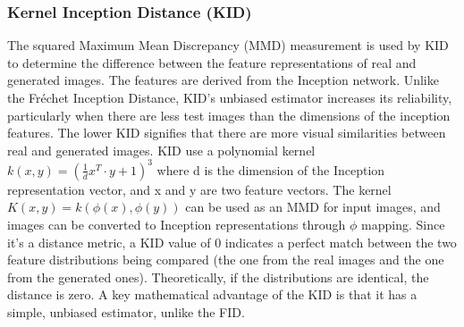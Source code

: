 \documentclass[journal]{IEEEtran}
\begin{document}
\subsubsection{Kernel Inception Distance (KID)}
The squared Maximum Mean Discrepancy (MMD) measurement is used by KID to determine the difference between the feature representations of real and generated images. The features are derived from the Inception network. Unlike the Fréchet Inception Distance\cite{heusel2017gans}, KID's unbiased estimator increases its reliability, particularly when there are less test images than the dimensions of the inception features. The lower KID signifies that there are more visual similarities between real and generated images\cite{kim2019ugatit}.
KID use a polynomial kernel $k(x,y)=(\frac{1}{d}x^T\cdot y+1)^3$ where d is the dimension of the Inception representation vector, and x and y are two feature vectors. The kernel $K(x,y)=k(\phi(x),\phi(y))$ can be used as an MMD for input images, and images can be converted to Inception representations through $\phi$ mapping\cite{binkowski2018demystifying}.
Since it's a distance metric, a KID value of 0 indicates a perfect match between the two feature distributions being compared (the one from the real images and the one from the generated ones). Theoretically, if the distributions are identical, the distance is zero. A key mathematical advantage of the KID is that it has a simple, unbiased estimator, unlike the FID\cite{binkowski2018demystifying}.
\end{document}

